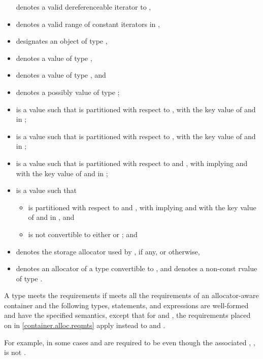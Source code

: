 \begin{itemize}
 denotes a valid dereferenceable iterator to ,
\item
\tcode{[q1, q2)} denotes a valid range of constant iterators in ,
\item
{} designates an object of type ,
\item
{} denotes a value of type ,
\item
{} denotes a value of type , and
\item
{} denotes a possibly  value of type ;
\item
{} is a value such that  is partitioned
with respect to ,
with  the key value of  and  in ;
\item
{} is a value such that  is partitioned with respect to
,
with  the key value of  and  in ;
\item
{} is a value such that  is partitioned with respect to
 and , with  implying
 and
with  the key value of  and  in ;
\item
{} is a value such that
\begin{itemize}
\item
{} is partitioned with respect to  and ,
with  implying  and
with  the key value of  and  in , and
\item
{} is not convertible to
either  or ; and
\end{itemize}
\item
{} denotes the storage allocator used by , if any, or  otherwise,
\item
{} denotes an allocator of a type convertible to ,
and  denotes a non-const rvalue of type .
\end{itemize}

\pnum
A type  meets the  requirements
if  meets all the requirements of an allocator-aware
container and
the following types, statements, and expressions are well-formed and
have the specified semantics,
except that for
 and , the requirements placed on 
in \ref{container.alloc.reqmts} apply instead to 
and .
\begin{note}
For example, in some cases  and 
are required to be  even though the associated
, , is not
.
\end{note}

